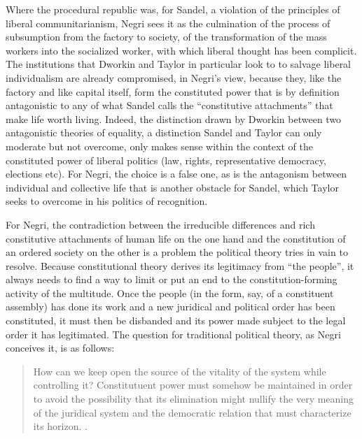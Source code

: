 \documentclass[12pt,oneside]{memoir}
\begin{document}
Where the procedural republic was, for Sandel, a violation of the principles of liberal communitarianism, Negri sees it as the culmination of the process of subsumption from the factory to society, of the transformation of the mass workers into the socialized worker, with which liberal thought has been complicit. The institutions that Dworkin and Taylor in particular look to to salvage liberal individualism are already compromised, in Negri's view, because they, like the factory and like capital itself, form the constituted power that is by definition antagonistic to any of what Sandel calls the ``constitutive attachments'' that make life worth living. Indeed, the distinction drawn by Dworkin between two antagonistic theories of equality, a distinction Sandel and Taylor can only moderate but not overcome, only makes sense within the context of the constituted power of liberal politics (law, rights, representative democracy, elections etc). For Negri, the choice is a false one, as is the antagonism between individual and collective life that is another obstacle for Sandel, which Taylor seeks to overcome in his politics of recognition. 
	
For Negri, the contradiction between the irreducible differences and rich constitutive attachments of human life on the one hand and the constitution of an ordered society on the other is a problem the political theory tries in vain to resolve. Because constitutional theory derives its legitimacy from ``the people'', it always needs to find a way to limit or put an end to the constitution-forming activity of the multitude. Once the people (in the form, say, of a constituent assembly) has done its work and a new juridical and political order has been constituted, it must then be disbanded and its power made subject to the legal order it has legitimated. The question for traditional political theory, as Negri conceives it, is as follows: 
	
	\begin{quote}
	How can we keep open the source of the vitality of the system while controlling it? Constitutuent power must somehow be maintained in order to avoid the possibility that its elimination might nullify the very meaning of the juridical system and the democratic relation that must characterize its horizon. \cite[4]{Negri1999}.
	\end{quote}
\end{document}
